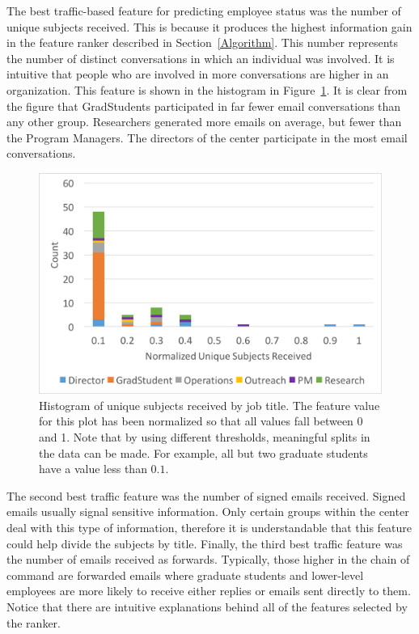 \documentclass[12pt]{report}
\begin{document}
The best traffic-based feature for predicting employee status was the number of unique subjects received.
This is because it produces the highest information gain in the feature ranker described in Section~\ref{Algorithm}.
This number represents the number of distinct conversations in which an individual was involved.
It is intuitive that people who are involved in more conversations are higher in an organization.
This feature is shown in the histogram in Figure~\ref{fig:traffic_ex_hist}.
It is clear from the figure that GradStudents participated in far fewer email conversations than any other group.
Researchers generated more emails on average, but fewer than the Program Managers.
The directors of the center participate in the most email conversations. 
\begin{figure}[t]
    \centering
        \includegraphics[width=\columnwidth,trim={1mm 17mm 1mm 2mm},clip]{Unique_subjects_rec_hist}
        \caption[Unique subjects received histogram]{Histogram of unique subjects received by job title.  The feature value for this plot has been normalized so that all values fall between 0 and 1.  Note that by using different thresholds, meaningful splits in the data can be made.  For example, all but two graduate students have a value less than $0.1$.}
        \label{fig:traffic_ex_hist}
\end{figure}

The second best traffic feature was the number of signed emails received.
Signed emails usually signal sensitive information.
Only certain groups within the center deal with this type of information, therefore it is understandable that this feature could help divide the subjects by title.
Finally, the third best traffic feature was the number of emails received as forwards.
Typically, those higher in the chain of command are forwarded emails where graduate students and lower-level employees are more likely to receive either replies or emails sent directly to them.
Notice that there are intuitive explanations behind all of the features selected by the ranker.
\end{document}
